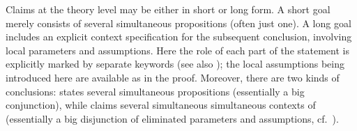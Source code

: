 \begin{isabellebody}
\begin{isamarkuptext}
  Claims at the theory level may be either in short or long form.  A
  short goal merely consists of several simultaneous propositions
  (often just one).  A long goal includes an explicit context
  specification for the subsequent conclusion, involving local
  parameters and assumptions.  Here the role of each part of the
  statement is explicitly marked by separate keywords (see also
  ); the local assumptions being introduced here
  are available as \hyperlink{fact.assms}{\mbox{}} in the proof.  Moreover, there
  are two kinds of conclusions: \hypertarget{element.shows}{\hyperlink{element.shows}{\mbox{}}} states several
  simultaneous propositions (essentially a big conjunction), while
  \hypertarget{element.obtains}{\hyperlink{element.obtains}{\mbox{}}} claims several simultaneous simultaneous
  contexts of (essentially a big disjunction of eliminated parameters
  and assumptions, cf.\ ).


\end{isamarkuptext}
\end{isabellebody}

